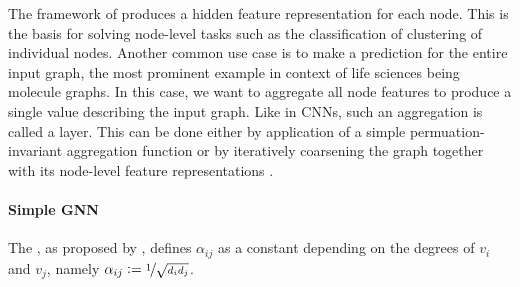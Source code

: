 \documentclass[
	fontsize=10pt, %
	twoside=false, %
	secnumdepth=1, %
  toc=indentunnumbered %
]{kaobook}
\begin{document}
The framework of  produces a hidden feature representation
for each node. This is the basis for solving node-level tasks such as the
classification of clustering of individual nodes. Another common use case is to
make a prediction for the entire input graph, the most prominent example in
context of life sciences being molecule graphs. In this case, we want to
aggregate all node features to produce a single value describing the input
graph. Like in CNNs, such an aggregation is called a  layer. This
can be done either by application of a simple permuation-invariant aggregation
function or by iteratively coarsening the graph together with its node-level
feature representations \cite{ying_hierarchical_2019}.


\paragraph{Simple GNN} The , as
proposed by \citeauthor{kipf_semi-supervised_2017}
\cite{kipf_semi-supervised_2017}, defines $\alpha_{ij}$ as a constant depending
on the degrees of $v_i$ and $v_j$, namely $\alpha_{ij} := \nicefrac{1}{\sqrt{d_i
    d_j}}$.
\end{document}
